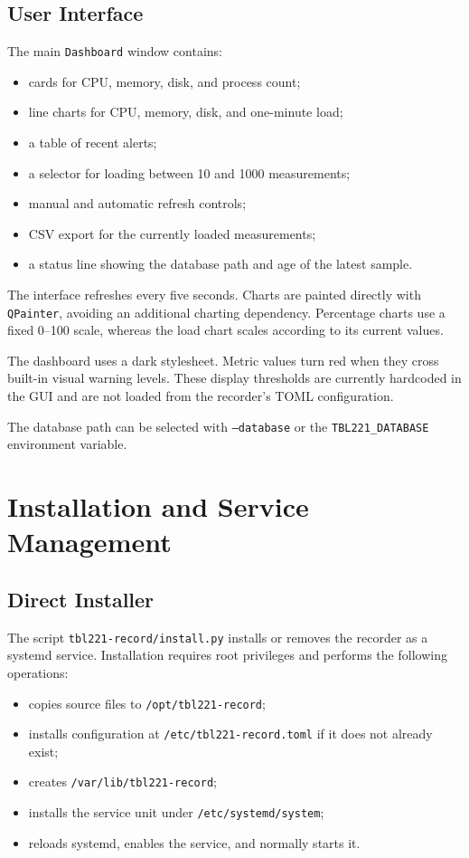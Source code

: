 \documentclass[11pt,a4paper]{article}
\begin{document}
\subsection{User Interface}

The main \texttt{Dashboard} window contains:

\begin{itemize}
  \item cards for CPU, memory, disk, and process count;
  \item line charts for CPU, memory, disk, and one-minute load;
  \item a table of recent alerts;
  \item a selector for loading between 10 and 1000 measurements;
  \item manual and automatic refresh controls;
  \item CSV export for the currently loaded measurements;
  \item a status line showing the database path and age of the latest sample.
\end{itemize}

The interface refreshes every five seconds. Charts are painted directly with \texttt{QPainter}, avoiding an additional charting dependency. Percentage charts use a fixed 0--100 scale, whereas the load chart scales according to its current values.

The dashboard uses a dark stylesheet. Metric values turn red when they cross built-in visual warning levels. These display thresholds are currently hardcoded in the GUI and are not loaded from the recorder's TOML configuration.

The database path can be selected with \texttt{--database} or the \texttt{TBL221\_DATABASE} environment variable.

\section{Installation and Service Management}

\subsection{Direct Installer}

The script \texttt{tbl221-record/install.py} installs or removes the recorder as a systemd service. Installation requires root privileges and performs the following operations:

\begin{itemize}
  \item copies source files to \texttt{/opt/tbl221-record};
  \item installs configuration at \texttt{/etc/tbl221-record.toml} if it does not already exist;
  \item creates \texttt{/var/lib/tbl221-record};
  \item installs the service unit under \texttt{/etc/systemd/system};
  \item reloads systemd, enables the service, and normally starts it.
\end{itemize}
\end{document}
